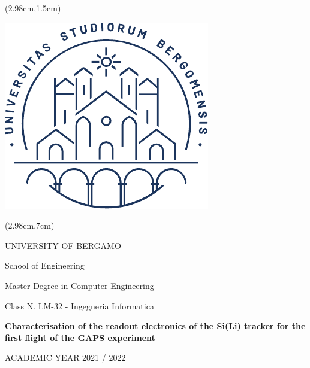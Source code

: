 \thispagestyle{empty}
\begin{textblock*}{\textwidth}(2.98cm,1.5cm)
    \begin{center}
        \vskip0.5cm
        \includegraphics[scale=0.75]{Images/unibg_logo_vector.pdf}  
    \end{center}
\end{textblock*}

\begin{textblock*}{\textwidth}(2.98cm,7cm)
    \begin{center}
        \large
        UNIVERSITY OF BERGAMO
    \end{center}
    \begin{center}
        School of Engineering
    \end{center}
    \vspace{-0.65cm}
    \begin{center}
        Master Degree in Computer Engineering
    \end{center}
    \vspace{-0.65cm}
    \begin{center}
        Class N. LM-32 - Ingegneria Informatica
    \end{center}
    \vspace{1cm}
    \begin{center}
        \LARGE
        \textbf{Characterisation of the readout electronics of the Si(Li) tracker for the first flight of the GAPS experiment}
    \end{center}
    \vspace{10.5cm}
    \begin{center}
         ACADEMIC YEAR 2021 / 2022
    \end{center}
\end{textblock*}

